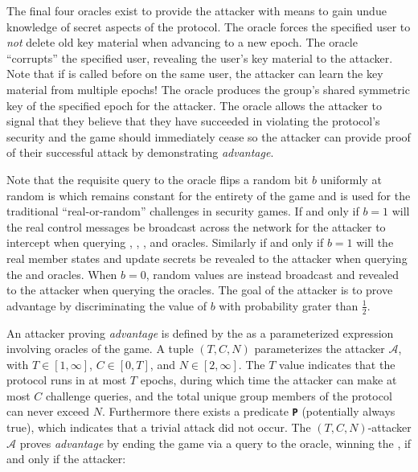 The final four oracles exist to provide the attacker with means to gain undue knowledge of secret aspects of the  protocol.
The  oracle forces the specified user to \emph{not} delete old key material when advancing to a new epoch.
The  oracle ``corrupts'' the specified user, revealing the user's key material to the attacker. Note that if  is called before  on the same user, the attacker can learn the key material from multiple epochs!
The  oracle produces the group's shared symmetric key of the specified epoch for the attacker.
The  oracle allows the attacker to signal that they believe that they have succeeded in violating the  protocol's security and the game should immediately cease so the attacker can provide proof of their successful attack by demonstrating \emph{advantage}.

Note that the requisite query to the  oracle flips a random bit \(b\) uniformly at random is which remains constant for the entirety of the game and is used for the traditional ``real-or-random'' challenges in security games.
If and only if \(b=1\) will the real control messages be broadcast across the network for the attacker to intercept when querying , , , and  oracles.
Similarly if and only if \(b=1\) will the real member states and update secrets be revealed to the attacker when querying the  and  oracles.
When \(b=0\), random values are instead broadcast and revealed to the attacker when querying the oracles.
The goal of the attacker is to prove advantage by discriminating the value of \(b\) with probability grater than \(\frac{1}{2}\).

An attacker proving \emph{advantage} is defined by the \CGKAsec as a parameterized expression involving oracles of the game.
A tuple \((T, C, N)\) parameterizes the attacker \(\mathcal{A}\), with \(T \in \left[1, \infty \right]\), \(C \in \left[0, T \right]\), and \(N \in \left[2, \infty \right]\).
The \(T\) value indicates that the protocol runs in at most \(T\) epochs, during which time the attacker can make at most \(C\) challenge queries, and the total unique group members of the protocol can never exceed \(N\).
Furthermore there exists a predicate \textbf{\texttt{P}} (potentially always true), which indicates that a trivial attack did not occur.
The \((T, C, N)\)-attacker \(\mathcal{A}\) proves \emph{advantage} by ending the game via a query to the  oracle, winning the \CGKAsec, if and only if the attacker:

